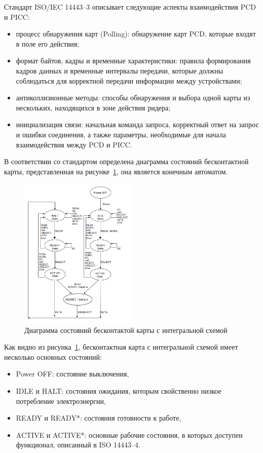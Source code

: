 Стандарт ISO/IEC 14443--3 описывает следующие аспекты взаимодействия PCD и PICC:

\begin{itemize}
    \item процесс обнаружения карт (Polling): обнаружение карт PCD, которые входят в поле его действия;
    \item формат байтов, кадры и временные характеристики: правила формирования кадров данных и временные интервалы передачи, которые должны соблюдаться для корректной передачи информации между устройствами;
    \item антиколлизионные методы: способы обнаружения и выбора одной карты из нескольких, находящихся в зоне действия ридера;
    \item инициализация связи: начальная команда запроса, корректный ответ на запрос и ошибки соединения, а также параметры, необходимые для начала взаимодействия между PCD и PICC.
\end{itemize}

В соответствии со стандартом определена диаграмма состояний бесконтактной карты, представленная на рисунке~\ref{fig:picc_states}, она является конечным автоматом.

\begin{figure}[H]
    \centering
    \includegraphics[width=0.5\textwidth]{images/research/picc_states}
    \caption{\centering Диаграмма состояний бесконтактой карты с интегральной схемой}
    \label{fig:picc_states}
\end{figure}

Как видно из рисунка~\ref{fig:picc_states}, бесконтактная карта с интегральной схемой имеет несколько основных состояний:

\begin{itemize}
    \item Power OFF: состояние выключения,
    \item IDLE и HALT: состояния ожидания, которым свойственно низкое потребление электроэнергии,
    \item READY и READY*: состояния готовности к работе,
    \item ACTIVE и ACTIVE*: основные рабочие состояния, в которых доступен функционал, описанный в ISO 14443--4.
\end{itemize}

